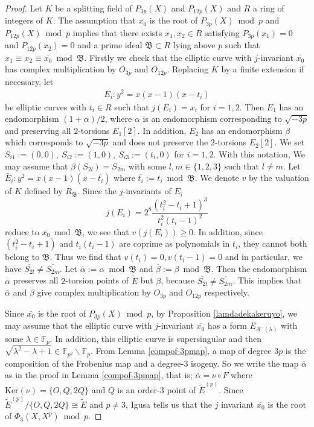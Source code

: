 \documentclass[a4paper, 11pt]{article}
\theoremstyle{plain}
\newcommand{\?}{\textcolor{red}{??}}
\newcommand{\lm}{\lambda}
\newcommand{\Lm}{\Lambda}
\newcommand{\fp}{\mathbb{F}_p}
\newcommand{\fpp}{\mathbb{F}_{p^2}}
\begin{document}
\begin{proof}
Let $K$ be a splitting field of $P_{3p}(X)$ and $P_{12p}(X)$ and $R$ a ring of integers of $K$. The assumption that $\overline{x_0}$ is the root of $P_{3p}(X) \bmod p $ and $P_{12p}(X)\bmod p$ implies that there exists $x_1,x_2 \in R$ satisfying $P_{3p}(x_1)=0$ and $P_{12p}(x_2)=0$ and a prime ideal $\mathfrak{B}\subset R$ lying above $p$ such that $x_1\equiv x_2\equiv\overline{x_0} \bmod \mathfrak{B}$. Firstly we check that the elliptic curve with $j$-invariant $\overline{x_0}$ has complex multiplication by $O_{3p}$ and $O_{12p}$. Replacing $K$ by a finite extension if necessary, let
\begin{eqnarray*}
    E_i:y^2=x(x-1)(x-t_i) 
\end{eqnarray*}
be elliptic curves with $t_i \in R$ such that $j(E_i)=x_i$ for $i=1,2$. 
Then $E_1$ has an endomorphism $(1+\alpha)/2$, where $\alpha$ is an endomorphism corresponding to $\sqrt{-3p}$ and preserving all $2$-torsions $E_1[2]$. In addition, $E_2$ has an endomorphism $\beta$ which corresponds to $\sqrt{-3p}$ and does not preserve the $2$-torsions $E_2[2]$. 
We set $S_{i1}:=(0,0),\  S_{i2}:=(1,0),\ S_{i3}:=(t_i,0)$ for $i=1,2$.
With this notation, We may assume that $\beta(S_{2l})=S_{2m}$ with some $l,m\in\{1,2,3\}$ such that $l\ne m$. Let $\tilde{E_i}:y^2=x(x-1)(x-\overline{t_i})$ where $\overline{t_i}:= t_i \bmod \mathfrak{B}$. We denote $v$ by the valuation of $K$ defined by $R_{\mathfrak{B}}$. Since \textcolor{black}{the} $j$-invariants of $E_i$
\[
j(E_{i})=2^8\frac{(t_i^2-t_i+1)^3}{t_i^2(t_i-1)^2}
\]
reduce to $\overline{x_0} \bmod \mathfrak{B}$, we see that $v(j(E_i))\ge0$. In addition, since $(t_i^2-t_i+1)$ and $t_i(t_i-1)$ are coprime as polynomials in $t_i$, they cannot both belong to $\mathfrak{B}$.  Thus we find that $v(t_i)=0,v(t_i-1)=0$ and in particular, we have $\overline{S_{2l}}\ne\overline{S_{2m}}$.
Let $\overline{\alpha}:=\alpha\bmod \mathfrak{B}$ and $\overline{\beta}:=\beta\bmod \mathfrak{B}$. Then the endomorphism $\overline{\alpha}$ preserves all $2$-torsion points of $\tilde{E}$ but $\beta$, because $\overline{S_{2l}} \ne \overline{S_{2m}}$.   %
This implies that $\overline{\alpha}$ and $\overline{\beta}$ give complex multiplication by $O_{3p}$ and $O_{12p}$ respectively.

     Since $\overline{x_0}$ is the root of $P_{3p}(X) \bmod p$, by Proposition \ref{lamdadekakeruyo}, we may assume that the elliptic curve with $j$-invariant $\overline{x_0}$ has a form $E_{\Lm^{-}(\lm)}$ with some $\lm\in\fp$. In addition, this elliptic curve is supersingular and then $\sqrt{\lm^2-\lm+1} \in \fpp\smallsetminus\fp$.
    From Lemma \ref{compof-3pmap}, a map of degree $3p$ is the composition of the Frobenius map and \textcolor{black}{a} degree-$3$ isogeny. So we write the map $\overline{\alpha}$ as in the proof in Lemma \ref{compof-3pmap}, that is;  $\overline{\alpha}=\nu \circ F$ where $\text{Ker}(\nu)=\{O,Q,2Q\}$ and $Q$ is an order-$3$ point of $\tilde{E}^{(p)}$. Since $\tilde{E}^{(p)}/\{O,Q,2Q\} \cong \tilde{E}$ and $p\ne 3$, Igusa \cite{Igusa_ell} tells us that the $j$ invariant $\overline{x_0}$ is the root of $\Phi_3(X,X^p) \bmod p$. 
    

\end{proof}
\end{document}
